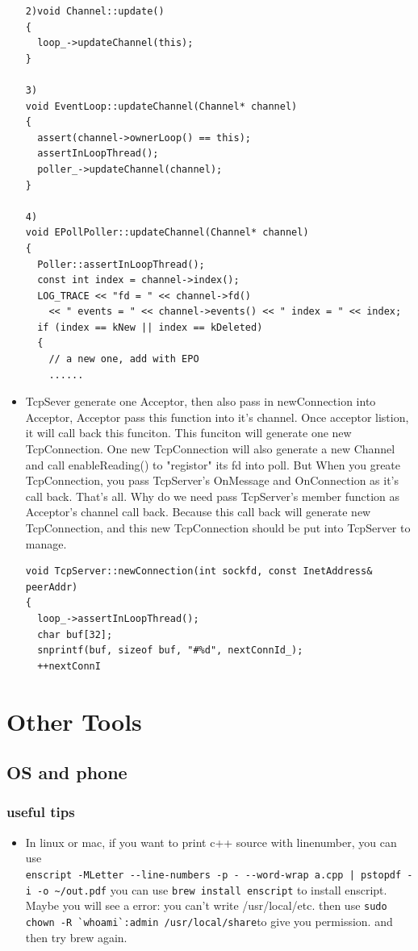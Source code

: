 \documentclass[a4paper,11pt,twoside]{book}
\begin{document}
\begin{itemize}
\begin{lstlisting}[]
2)void Channel::update()
{
  loop_->updateChannel(this);
}

3)
void EventLoop::updateChannel(Channel* channel)
{
  assert(channel->ownerLoop() == this);
  assertInLoopThread();
  poller_->updateChannel(channel);
}

4)
void EPollPoller::updateChannel(Channel* channel)
{
  Poller::assertInLoopThread();
  const int index = channel->index();
  LOG_TRACE << "fd = " << channel->fd()
    << " events = " << channel->events() << " index = " << index;
  if (index == kNew || index == kDeleted)
  {
    // a new one, add with EPO
    ......
\end{lstlisting}

\item TcpSever generate one Acceptor, then also pass in newConnection into Acceptor, Acceptor pass this function into it's channel.  Once acceptor listion, it will call back this funciton.  This funciton will generate one new TcpConnection. One new TcpConnection will also generate a new Channel and call enableReading() to "registor" its fd into poll. But When you greate TcpConnection, you pass TcpServer's OnMessage and OnConnection as it's call back. That's all. Why do we need pass TcpServer's member function as Acceptor's channel call back. Because this call back will generate new TcpConnection, and this new TcpConnection should be put into TcpServer to manage.  

\begin{lstlisting}[]
void TcpServer::newConnection(int sockfd, const InetAddress& peerAddr)
{
  loop_->assertInLoopThread();
  char buf[32];
  snprintf(buf, sizeof buf, "#%d", nextConnId_);
  ++nextConnI
\end{lstlisting}

\end{itemize}



\chapter{Other Tools}

\section{OS and phone}

\subsection{useful tips}
\begin{itemize}
\item In linux or mac, if you want to print c++ source with linenumber, you can use \\
\verb=enscript -MLetter --line-numbers -p - --word-wrap a.cpp | pstopdf -i -o ~/out.pdf=
you can use \verb=brew install enscript= to install enscript. Maybe you will see a error: you can't write /usr/local/etc.
then use \verb=sudo chown -R `whoami`:admin /usr/local/share=to give you permission. and then try brew again. 
\end{itemize}
\end{document}
